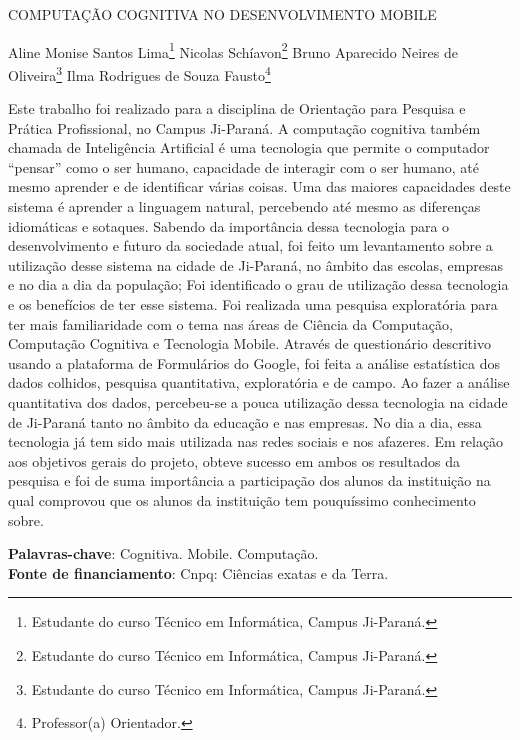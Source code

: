 \documentclass[article,12pt,onesidea,4paper,english,brazil]{abntex2}
\begin{document}
	
	
	\frenchspacing 
	
	\begin{center}
		\LARGE COMPUTAÇÃO COGNITIVA NO DESENVOLVIMENTO MOBILE
		
		\normalsize
	Aline Monise Santos Lima\footnote{Estudante do curso Técnico em Informática, Campus Ji-Paraná.} 
		Nicolas Schíavon\footnote{Estudante do curso Técnico em Informática, Campus Ji-Paraná.} 
		Bruno Aparecido Neires de Oliveira\footnote{Estudante do curso Técnico em Informática, Campus Ji-Paraná.} 
		Ilma Rodrigues de Souza Fausto\footnote{Professor(a) Orientador.} 
	\end{center}
	
	\noindent
	Este trabalho foi realizado para a disciplina de Orientação para Pesquisa e Prática
	Profissional, no Campus Ji-Paraná. A computação cognitiva também chamada de
	Inteligência Artificial é uma tecnologia que permite o computador “pensar” como o
	ser humano, capacidade de interagir com o ser humano, até mesmo aprender e de
	identificar várias coisas. Uma das maiores capacidades deste sistema é aprender a
	linguagem natural, percebendo até mesmo as diferenças idiomáticas e sotaques.
	Sabendo da importância dessa tecnologia para o desenvolvimento e futuro da
	sociedade atual, foi feito um levantamento sobre a utilização desse sistema na
	cidade de Ji-Paraná, no âmbito das escolas, empresas e no dia a dia da população;
	Foi identificado o grau de utilização dessa tecnologia e os benefícios de ter esse
	sistema. Foi realizada uma pesquisa exploratória para ter mais familiaridade com o
	tema nas áreas de Ciência da Computação, Computação Cognitiva e Tecnologia
	Mobile. Através de questionário descritivo usando a plataforma de Formulários do
	Google, foi feita a análise estatística dos dados colhidos, pesquisa quantitativa,
	exploratória e de campo. Ao fazer a análise quantitativa dos dados, percebeu-se a
	pouca utilização dessa tecnologia na cidade de Ji-Paraná tanto no âmbito da
	educação e nas empresas. No dia a dia, essa tecnologia já tem sido mais utilizada
	nas redes sociais e nos afazeres. Em relação aos objetivos gerais do projeto, obteve
	sucesso em ambos os resultados da pesquisa e foi de suma importância a
	participação dos alunos da instituição na qual comprovou que os alunos da
	instituição tem pouquíssimo conhecimento sobre.
	
	\vspace{\onelineskip}
	
	\noindent
	\textbf{Palavras-chave}: Cognitiva. Mobile. Computação. \\
	\textbf{Fonte de financiamento}: Cnpq: Ciências exatas e da Terra.
	
\end{document}
